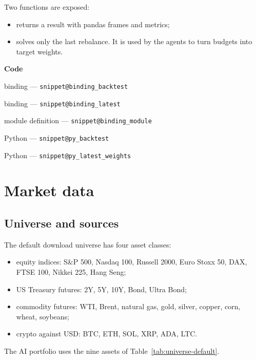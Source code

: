 \documentclass[11pt,a4paper]{article}
\makeatletter
\newcommand{\snippetsource}[1]{\csname snippet@#1\endcsname}
\newcommand{\snippet}[3]{%
  }
\newenvironment{codepointers}{%
  \par\smallskip\begingroup\footnotesize\noindent\textcolor{blue!50!black}{\textbf{Code}}\par\nopagebreak
  \begin{list}{}{\setlength{\leftmargin}{1.2em}\setlength{\itemsep}{0pt}\setlength{\parsep}{0pt}\setlength{\topsep}{1pt}}}%
  {\end{list}\endgroup\smallskip}
\newcommand{\codeitem}[2]{\item #2 --- \texttt{\snippetsource{#1}}}
\makeatother
\begin{document}
Two functions are exposed:
\begin{itemize}
  \item {} returns a result with
        pandas frames and metrics;
  \item {} solves only the last rebalance. It
        is used by the agents to turn budgets into target weights.
\end{itemize}
\snippet{binding_prepare}{C++}{Shared preparation: parse, align, window, returns, budgets}
\snippet{py_backtest_inputs}{Python}{pandas to C++}
\begin{codepointers}
  \codeitem{binding_backtest}{ binding}
  \codeitem{binding_latest}{ binding}
  \codeitem{binding_module}{module definition}
  \codeitem{py_backtest}{Python }
  \codeitem{py_latest_weights}{Python }
\end{codepointers}

\section{Market data}\label{sec:marketdata}

\subsection{Universe and sources}
The default download universe has four asset classes:
\begin{itemize}
  \item equity indices: S\&P 500, Nasdaq 100, Russell 2000, Euro Stoxx 50, DAX, FTSE 100,
        Nikkei 225, Hang Seng;
  \item US Treasury futures: 2Y, 5Y, 10Y, Bond, Ultra Bond;
  \item commodity futures: WTI, Brent, natural gas, gold, silver, copper, corn, wheat,
        soybeans;
  \item crypto against USD: BTC, ETH, SOL, XRP, ADA, LTC.
\end{itemize}
The AI portfolio uses the nine assets of Table~\ref{tab:universe-default}.
\end{document}

